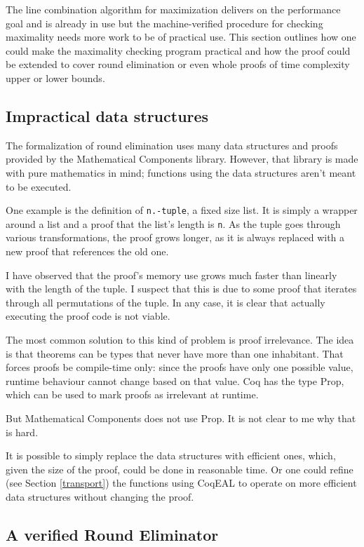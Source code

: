 \documentclass[english, 12pt, a4paper, sci, a-1b, online]{aaltothesis}
\newcommand\icoq[1]{\texttt{#1}}
\begin{document}
The line combination algorithm for maximization delivers on the performance goal and is already in use but the machine-verified procedure for checking maximality needs more work to be of practical use. This section outlines how one could make the maximality checking program practical and how the proof could be extended to cover round elimination or even whole proofs of time complexity upper or lower bounds.

\subsection{Impractical data structures}\label{badds}

The formalization of round elimination uses many data structures and proofs provided by the Mathematical Components library. However, that library is made with pure mathematics in mind; functions using the data structures aren't meant to be executed.

One example is the definition of \icoq{n.-tuple}, a fixed size list. It is simply a wrapper around a list and a proof that the list's length is \icoq{n}. As the tuple goes through various transformations, the proof grows longer, as it is always replaced with a new proof that references the old one.

I have observed that the proof's memory use grows much faster than linearly with the length of the tuple. I suspect that this is due to some proof that iterates through all permutations of the tuple. In any case, it is clear that actually executing the proof code is not viable.

The most common solution to this kind of problem is proof irrelevance. The idea is that theorems can be types that never have more than one inhabitant. That forces proofs be compile-time only: since the proofs have only one possible value, runtime behaviour cannot change based on that value. Coq has the type Prop, which can be used to mark proofs as irrelevant at runtime.

But Mathematical Components does not use Prop. It is not clear to me why that is hard.

It is possible to simply replace the data structures with efficient ones, which, given the size of the proof, could be done in reasonable time. Or one could refine (see Section \ref{transport}) the functions using CoqEAL to operate on more efficient data structures without changing the proof.

\subsection{A verified Round Eliminator}
\end{document}
